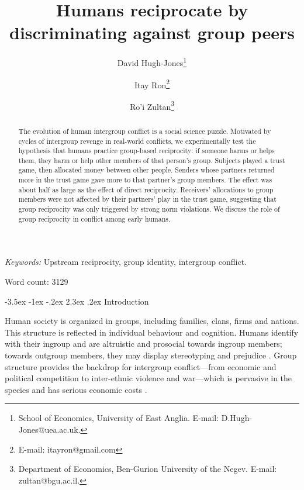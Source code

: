 \documentclass[12pt,a4paper]{article}\usepackage[]{graphicx}\usepackage[]{color}
\title{\bf\sffamily Humans reciprocate %
by discriminating against group peers}
\author{David Hugh-Jones\thanks{School of Economics, University of East Anglia. E-mail: D.Hugh-Jones@uea.ac.uk.} \and Itay Ron\thanks{E-mail: itayron@gmail.com} \and Ro'i Zultan\thanks{Department of Economics, Ben-Gurion University of the Negev. E-mail: zultan@bgu.ac.il.}}
\date{}%
\makeatletter
\renewcommand\section{\@startsection {section}{1}{\z@}%
{-3.5ex \@plus -1ex \@minus -.2ex}%
{2.3ex \@plus.2ex}%
{\bf\sffamily\Large}}
\makeatother
\begin{document}
\maketitle

\begin{abstract}
The evolution of human intergroup conflict is a social science puzzle. 
Motivated by cycles of intergroup revenge in real-world conflicts, we experimentally
test the hypothesis that humans practice group-based reciprocity: if someone
harms or helps them, they harm or help other members of that person's group.
Subjects played a trust game, then allocated money between other people. Senders
whose partners returned more in the trust game gave more to that partner's group
members. The effect was about half as large as the effect of direct reciprocity.
Receivers' allocations to group members were not affected by their partners’ 
play in the trust game, suggesting that group reciprocity was only triggered by
strong norm violations. We discuss the role of group reciprocity in conflict among early humans.
\end{abstract}

\emph{Keywords:} Upstream reciprocity, group identity, intergroup conflict.

Word count: 3129

\newpage

\section{Introduction}

Human society is organized in groups, including families, clans, firms and nations. This
structure is reflected in individual behaviour and cognition. Humans identify
with their ingroup and are altruistic and prosocial towards ingroup members;
towards outgroup members, they may display stereotyping and prejudice
\citep{tajfel1979integrative,yamagishi2000thegroup,balliet2014ingroup,DeDreu2014,chen2009group,chen2011potential}.
Group structure provides the backdrop for intergroup conflict---from economic
and political competition to inter-ethnic violence and war---which is pervasive
in the species \citep{esteban2012ethnicity} and has serious economic costs \citep{world_bank_world_2011}.
\end{document}
